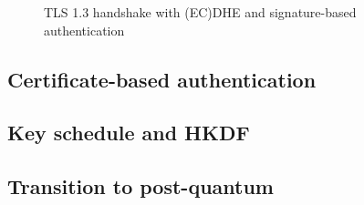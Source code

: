 \documentclass[letterpaper,12pt,titlepage,oneside,final]{book}
\newcommand{\keygen}{\texttt{KeyGen}}
\newcommand{\kem}{\texttt{KEM}}
\newcommand{\encap}{\texttt{Encap}}
\newcommand{\decap}{\texttt{Decap}}
\newcommand{\sign}{\texttt{Sign}}
\newcommand{\pk}{\texttt{pk}}
\newcommand{\sk}{\texttt{sk}}
\newcommand{\leftsample}{\stackrel{\$}{\leftarrow}}
\begin{document}
\begin{figure}[htbp]
\begin{tikzpicture}[node distance=2em and 2.5cm, font=\footnotesize]
    \end{tikzpicture}
    \caption{TLS 1.3 handshake with (EC)DHE and signature-based authentication}
    \label{fig:classical-tls13-handshake}
\end{figure}

\subsection{Certificate-based authentication}

\subsection{Key schedule and HKDF}

\subsection{Transition to post-quantum}
\end{document}

